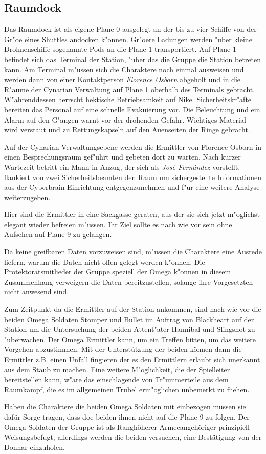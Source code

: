 \subsection{Raumdock}
Das Raumdock ist als eigene Plane 0 ausgelegt an der bis zu vier Schiffe von der Gr"o\3e eines Shuttles andocken k"onnen. Gr"o\3ere Ladungen werden "uber kleine Drohnenschiffe sogenannte Pods an die Plane 1 transportiert. Auf Plane 1 befindet sich das Terminal der Station, "uber das die Gruppe die Station betreten kann. Am Terminal m"ussen sich die Charaktere noch einmal ausweisen und werden dann von einer Kontaktperson \emph{Florence Osborn} abgeholt und in die R"aume der Cynarian Verwaltung auf Plane 1 oberhalb des Terminals gebracht. W"ahrenddessen herrscht hektische Betriebsamkeit auf Nike. Sicherheitskr"afte bereiten das Personal auf eine schnelle Evakuierung vor. Die Beleuchtung und ein Alarm auf den G"angen warnt vor der drohenden Gefahr. Wichtiges Material wird verstaut und zu Rettungskapseln auf den Au\3enseiten der Ringe gebracht.

Auf der Cynarian Verwaltungsebene werden die Ermittler von Florence Osborn in einen Besprechungsraum gef"uhrt und gebeten dort zu warten. Nach kurzer Wartezeit betritt ein Mann in Anzug, der sich als \emph{Jos\'e Fern\'andez} vorstellt, flankiert von zwei Sicherheitsbeamten den Raum um sichergestellte Informationen aus der Cyberbrain Einrichtung entgegenzunehmen und f"ur eine weitere Analyse weiterzugeben. 

\begin{remarks}
	Hier sind die Ermittler in eine Sackgasse geraten, aus der sie sich jetzt m"oglichst elegant wieder befreien m"ussen. Ihr Ziel sollte es nach wie vor sein ohne Aufsehen auf Plane 9 zu gelangen. 

	Da keine greifbaren Daten vorzuweisen sind, m"ussen die Charaktere eine Ausrede liefern, warum die Daten nicht offen gelegt werden k"onnen. Die Protektoratsmitlieder der Gruppe speziell der Omega k"onnen in diesem Zusammenhang verweigern die Daten bereitzustellen, solange ihre Vorgesetzten nicht anwesend sind.

	Zum Zeitpunkt da die Ermittler auf der Station ankommen, sind nach wie vor die beiden Omega Soldaten Stomper und Bullet im Auftrag von Blackheart auf der Station um die Untersuchung der beiden Attent"ater Hannibal und Slingshot zu "uberwachen. Der Omega Ermittler kann, um ein Treffen bitten, um das weitere Vorgehen abzustimmen. Mit der Unterstützung der beiden können dann die Ermittler z.B. einen Unfall fingieren der es den Ermittlern erlaubt sich unerkannt aus dem Staub zu machen. Eine weitere M"oglichkeit, die der Spielleiter bereitstellen kann, w"are das einschlagende von Tr"ummerteile aus dem Raumkampf, die es im allgemeinen Trubel erm"oglichen unbemerkt zu fliehen.

	Haben die Charaktere die beiden Omega Soldaten mit einbezogen müssen sie dafür Sorge tragen, dass doe beiden ihnen nicht auf die Plane 9 zu folgen. Der Omega Soldaten der Gruppe ist als Ranghöherer Armeeangehöriger prinzipiell Weisungsbefugt, allerdings werden die beiden versuchen, eine Bestätigung von der Donnar einzuholen.
\end{remarks}
